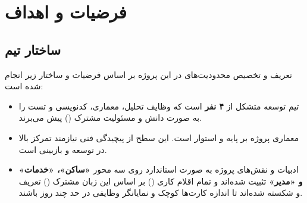 \chapter{فرضیات و اهداف}


\section{ساختار تیم}
تعریف و تخصیص محدودیت‌های  در این پروژه بر اساس فرضیات و ساختار زیر انجام شده است:
\begin{itemize}
	\item تیم توسعه متشکل از \textbf{۴ نفر} است که وظایف تحلیل، معماری، کدنویسی و تست را به صورت دانش و مسئولیت مشترک () پیش می‌برند.
	\item معماری پروژه بر پایه  و  استوار است. این سطح از پیچیدگی فنی نیازمند تمرکز بالا در توسعه و بازبینی است.
	\item ادبیات و نقش‌های پروژه به صورت استاندارد روی سه محور \textbf{«ساکن»، «خدمات» و «مدیر»} تثبیت شده‌اند و تمام اقلام کاری () بر اساس این زبان مشترک () تعریف و شکسته شده‌اند تا اندازه کارت‌ها کوچک و نمایانگر وظایفی در حد چند روز باشند.
\end{itemize}